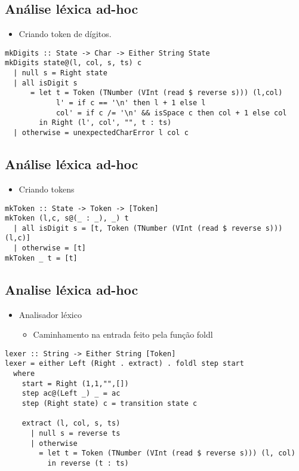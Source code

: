 \documentclass[11pt]{article}
\begin{document}
\subsection*{Análise léxica ad-hoc}
\label{sec:org18c2d63}

\begin{itemize}
\item Criando token de dígitos.
\end{itemize}

\begin{verbatim}
mkDigits :: State -> Char -> Either String State  
mkDigits state@(l, col, s, ts) c 
  | null s = Right state 
  | all isDigit s 
      = let t = Token (TNumber (VInt (read $ reverse s))) (l,col)
            l' = if c == '\n' then l + 1 else l 
            col' = if c /= '\n' && isSpace c then col + 1 else col  
        in Right (l', col', "", t : ts)
  | otherwise = unexpectedCharError l col c
\end{verbatim}
\subsection*{Análise léxica ad-hoc}
\label{sec:org5dca865}

\begin{itemize}
\item Criando tokens
\end{itemize}

\begin{verbatim}
mkToken :: State -> Token -> [Token]
mkToken (l,c, s@(_ : _), _) t 
  | all isDigit s = [t, Token (TNumber (VInt (read $ reverse s))) (l,c)]
  | otherwise = [t]
mkToken _ t = [t] 
\end{verbatim}
\subsection*{Analise léxica ad-hoc}
\label{sec:org4822d3d}

\begin{itemize}
\item Analisador léxico 
\begin{itemize}
\item Caminhamento na entrada feito pela função foldl
\end{itemize}
\end{itemize}

\begin{verbatim}
lexer :: String -> Either String [Token]
lexer = either Left (Right . extract) . foldl step start 
  where 
    start = Right (1,1,"",[])
    step ac@(Left _) _ = ac 
    step (Right state) c = transition state c  

    extract (l, col, s, ts) 
      | null s = reverse ts 
      | otherwise 
        = let t = Token (TNumber (VInt (read $ reverse s))) (l, col)
          in reverse (t : ts)
\end{verbatim}
\end{document}
